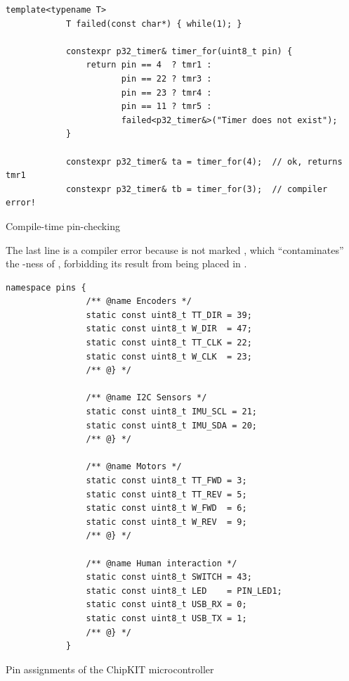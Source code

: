 \documentclass[main.tex]{subfiles}
\begin{document}
	\begin{listingfloat}
		\centering
		\begin{lstlisting}[language={[11]c++},gobble=6,frame=single]
			template<typename T>
			T failed(const char*) { while(1); }

			constexpr p32_timer& timer_for(uint8_t pin) {
				return pin == 4  ? tmr1 :
				       pin == 22 ? tmr3 :
				       pin == 23 ? tmr4 :
				       pin == 11 ? tmr5 :
				       failed<p32_timer&>("Timer does not exist");
			}

			constexpr p32_timer& ta = timer_for(4);  // ok, returns tmr1
			constexpr p32_timer& tb = timer_for(3);  // compiler error!
		\end{lstlisting}
		\caption{Compile-time pin-checking}
		\label{lst:constexpr}
		\medskip
		\small
		The last line is a compiler error because  is not marked , which \enquote{contaminates} the -ness of , forbidding its result from being placed in .
	\end{listingfloat}

	\begin{listingfloat}[!tb]
		\begin{lstlisting}[language={[11]c++},gobble=6,frame=single]
			namespace pins {
				/** @name Encoders */
				static const uint8_t TT_DIR = 39;
				static const uint8_t W_DIR  = 47;
				static const uint8_t TT_CLK = 22;
				static const uint8_t W_CLK  = 23;
				/** @} */

				/** @name I2C Sensors */
				static const uint8_t IMU_SCL = 21;
				static const uint8_t IMU_SDA = 20;
				/** @} */

				/** @name Motors */
				static const uint8_t TT_FWD = 3;
				static const uint8_t TT_REV = 5;
				static const uint8_t W_FWD  = 6;
				static const uint8_t W_REV  = 9;
				/** @} */

				/** @name Human interaction */
				static const uint8_t SWITCH = 43;
				static const uint8_t LED    = PIN_LED1;
				static const uint8_t USB_RX = 0;
				static const uint8_t USB_TX = 1;
				/** @} */
			}
		\end{lstlisting}
		\caption{Pin assignments of the ChipKIT microcontroller}
		\label{lst:pins}
	\end{listingfloat}
\end{document}
